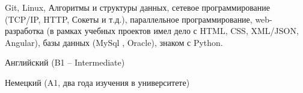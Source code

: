 


  \begin{cvparagraph}

Git, Linux, Алгоритмы и структуры данных, сетевое программирование (TCP/IP, HTTP, Сокеты и т.д.), параллельное программирование, web-разработка (в рамках учебных проектов имел дело с HTML, CSS, XML/JSON, Angular), базы данных (MySql , Oracle), знаком с Python.
\end{cvparagraph}


\begin{cvparagraph}

  \begin{cvitems} %
        \item {
        Английский (B1 -- Intermediate)}
        \item {Немецкий (A1, два года изучения в университете)}
      \end{cvitems}
      
\end{cvparagraph}







 

